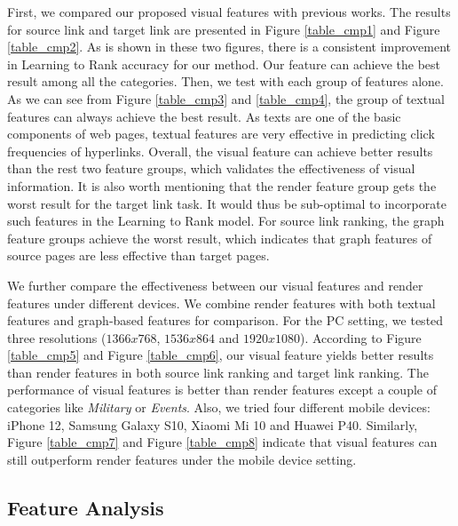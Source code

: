 First, we compared our proposed visual features with previous works. The results for source link and target link are presented in Figure \ref{table_cmp1} and Figure \ref{table_cmp2}. As is shown in these two figures, there is a consistent improvement in Learning to Rank accuracy for our method. Our feature can achieve the best result among all the categories. Then, we test with each group of features alone. As we can see from Figure \ref{table_cmp3} and \ref{table_cmp4}, the group of textual features can always achieve the best result. As texts are one of the basic components of web pages, textual features are very effective in predicting click frequencies of hyperlinks. Overall, the visual feature can achieve better results than the rest two feature groups, which validates the effectiveness of visual information. It is also worth mentioning that the render feature group gets the worst result for the target link task. It would thus be sub-optimal to incorporate such features in the Learning to Rank model. For source link ranking, the graph feature groups achieve the worst result, which indicates that graph features of source pages are less effective than target pages.

We further compare the effectiveness between our visual features and render features under different devices. We combine render features with both textual features and graph-based features for comparison. For the PC setting, we tested three resolutions ($1366x768$, $1536x864$ and $1920x1080$). According to Figure \ref{table_cmp5} and Figure \ref{table_cmp6}, our visual feature yields better results than render features in both source link ranking and target link ranking. The performance of visual features is better than render features except a couple of categories like \emph{Military} or \emph{Events}. Also, we tried four different mobile devices: iPhone 12, Samsung Galaxy S10, Xiaomi Mi 10 and Huawei P40. Similarly, Figure \ref{table_cmp7} and Figure \ref{table_cmp8} indicate that visual features can still outperform render features under the mobile device setting.

\subsection{Feature Analysis}

